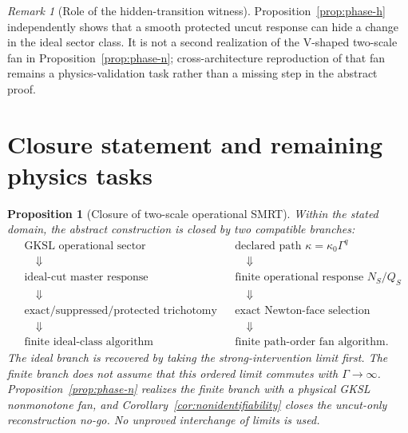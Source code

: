 \documentclass[11pt]{article}
\newtheorem{proposition}[theorem]{Proposition}
\theoremstyle{definition}
\theoremstyle{remark}
\newtheorem{remark}[theorem]{Remark}
\theoremstyle{plain}
\begin{document}
\begin{remark}[Role of the hidden-transition witness]
Proposition~\ref{prop:phase-h} independently shows that a smooth protected
uncut response can hide a change in the ideal sector class.  It is not a
second realization of the V-shaped two-scale fan in
Proposition~\ref{prop:phase-n}; cross-architecture reproduction of that fan
remains a physics-validation task rather than a missing step in the abstract
proof.
\end{remark}

\section{Closure statement and remaining physics tasks}

\begin{proposition}[Closure of two-scale operational SMRT]\label{prop:closure}
Within the stated domain, the abstract construction is closed by two
compatible branches:
\[
\boxed{
\begin{aligned}
 &\text{GKSL operational sector}
 &&\text{declared path }\kappa=\kappa_0\Gamma^q\\
 &\quad\Downarrow &&\quad\Downarrow\\[-1mm]
 &\text{ideal-cut master response}
 &&\text{finite operational response }N_S/Q_S\\
 &\quad\Downarrow &&\quad\Downarrow\\[-1mm]
 &\text{exact/suppressed/protected trichotomy}
 &&\text{exact Newton-face selection}\\
 &\quad\Downarrow &&\quad\Downarrow\\[-1mm]
 &\text{finite ideal-class algorithm}
 &&\text{finite path-order fan algorithm}.
\end{aligned}}
\]
The ideal branch is recovered by taking the strong-intervention limit first.
The finite branch does not assume that this ordered limit commutes with
$\Gamma\to\infty$.  Proposition~\ref{prop:phase-n} realizes the finite branch
with a physical GKSL nonmonotone fan, and
Corollary~\ref{cor:nonidentifiability} closes the uncut-only reconstruction
no-go.  No unproved interchange of limits is used.
\end{proposition}
\end{document}
